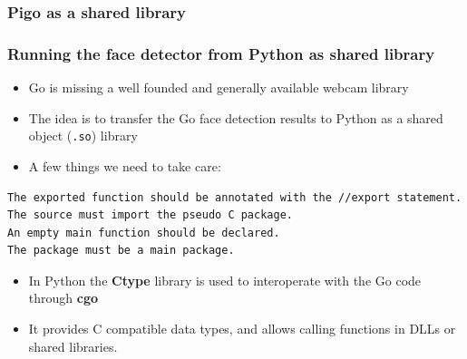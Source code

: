 \documentclass[9pt]{beamer}
\begin{document}
\begin{frame}[fragile]
\frametitle{Pigo as a shared library}


\end{frame}

\begin{frame}[fragile]
\frametitle{Running the face detector from Python as shared library}


\begin{itemize}
\item Go is missing a well founded and generally available webcam library
\end{itemize}

\begin{itemize}
\item The idea is to transfer the Go face detection results to Python as a shared object (\texttt{.so}) library
\item A few things we need to take care:
\end{itemize}


\begin{verbatim}
The exported function should be annotated with the //export statement.
The source must import the pseudo C package.
An empty main function should be declared.
The package must be a main package.

\end{verbatim}


\begin{itemize}
\item In Python the \textbf{Ctype} library is used to interoperate with the Go code through \textbf{cgo}
\item It provides C compatible data types, and allows calling functions in DLLs or shared libraries.
\end{itemize}


\end{frame}
\end{document}
